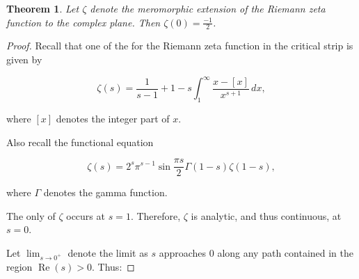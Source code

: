 \documentclass[12pt]{article}
\newtheorem*{thm*}{Theorem}
\begin{document}
\begin{thm*}
Let $\zeta$ denote the meromorphic extension of the Riemann zeta function to the  complex plane.  Then $\displaystyle \zeta(0)=\frac{-1}{2}$.
\end{thm*}

\begin{proof}
Recall that one of the  for the Riemann zeta function in the critical strip is given by

$$\zeta(s)=\frac{1}{s-1}+1-s\int_1^{\infty} \frac{x-[x]}{x^{s+1}} \,dx,$$

where $[x]$ denotes the integer part of $x$.

Also recall the functional equation

$$\zeta(s) = 2^s \pi^{s-1} \sin \frac{\pi s}{2} \Gamma(1-s) \zeta(1-s),$$

where $\Gamma$ denotes the gamma function.

The only  of $\zeta$ occurs at $s=1$.  Therefore, $\zeta$ is analytic, and thus continuous, at $s=0$.

Let $\displaystyle \lim_{s \to 0^+}$ denote the limit as $s$ approaches $0$ along any path contained in the region $\operatorname{Re}(s)>0$.  Thus:


\end{proof}
\end{document}
